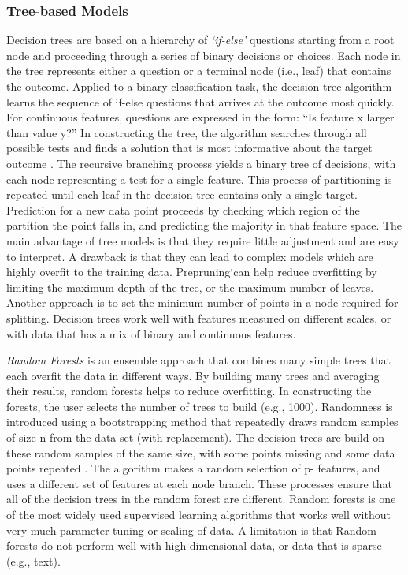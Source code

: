 \documentclass[sigconf]{acmart}
\begin{document}
\subsubsection{Tree-based Models} Decision trees are based on a hierarchy of 
\emph{`if-else'} questions starting from a root node and proceeding through a 
series of binary decisions or choices. Each node in the tree represents either 
a question or a terminal node (i.e., leaf) that contains the outcome. Applied to 
a binary classification task, the decision tree algorithm learns the sequence
of if-else questions that arrives at the outcome most quickly. For continuous 
features, questions are expressed in the form: ``Is feature x larger than 
value y?'' In constructing the tree, the algorithm searches through all 
possible tests and finds a solution that is most informative about the target 
outcome \cite{muller17}. The recursive branching process yields a binary tree 
of decisions, with each node representing a test for a single feature. This 
process of partitioning is repeated until each leaf in the decision tree 
contains only a single target. Prediction for a new data point proceeds by 
checking which region of the partition the point falls in, and predicting the 
majority in that feature space. The main advantage of tree models is that they 
require little adjustment and are easy to interpret. A drawback is that they 
can lead to complex models which are highly overfit to the training data. 
Prepruning`can help reduce overfitting by limiting the maximum depth of the 
tree, or the maximum number of leaves. Another approach is to set the minimum 
number of points in a node required for splitting. Decision trees work well 
with features measured on different scales, or with data that has a mix of 
binary and continuous features. 


\emph{Random Forests} is an ensemble approach that combines many simple trees 
that each overfit the data in different ways. By building many trees and 
averaging their results, random forests helps to reduce overfitting. In 
constructing the forests, the user selects the number of trees to build 
(e.g., 1000). Randomness is introduced using a bootstrapping method that 
repeatedly draws random samples of size n from the data set (with replacement).  
The decision trees are build on these random samples of the same size, with 
some points missing and some data points repeated \cite{muller17,raschka17}.
The algorithm makes a random selection of p- features, and uses a different 
set of features at each node branch. These processes ensure that all of the 
decision trees in the random forest are different. Random forests is one of 
the most widely used supervised learning algorithms that works well without 
very much parameter tuning or scaling of data. A limitation is that Random 
forests do not perform well with high-dimensional data, or data that is 
sparse (e.g., text).
\end{document}
